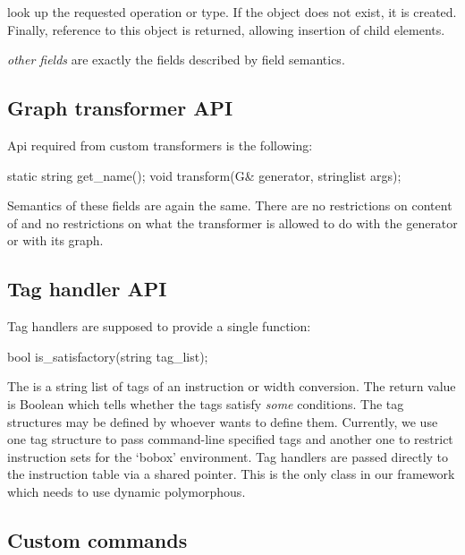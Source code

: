 \begin{description}
  \item {} look up the requested operation or type. If the object does not exist, it is created. Finally, reference to this object is returned, allowing insertion of child elements.
  \item \emph{other fields} are exactly the fields described by field semantics.
\end{description}

\subsection{Graph transformer API}

Api required from custom transformers is the following:
\mybeginfig
\begin{code}
 static string get_name();
 void transform(G& generator, stringlist args);
\end{code}

Semantics of these fields are again the same. There are no restrictions on content of  and no restrictions on what the transformer is allowed to do with the generator or with its graph.

\subsection{Tag handler API}

Tag handlers are supposed to provide a single function:

\mybeginfig
\begin{code}
bool is_satisfactory(string tag_list);
\end{code}

The  is a string list of tags of an instruction or width conversion. The return value is Boolean which tells whether the tags satisfy \emph{some} conditions. The tag structures may be defined by whoever wants to define them. Currently, we use one tag structure to pass command-line specified tags and another one to restrict instruction sets for the `bobox' environment. Tag handlers are passed directly to the instruction table via a shared pointer. This is the only class in our framework which needs to use dynamic polymorphous.

\subsection{Custom commands}

